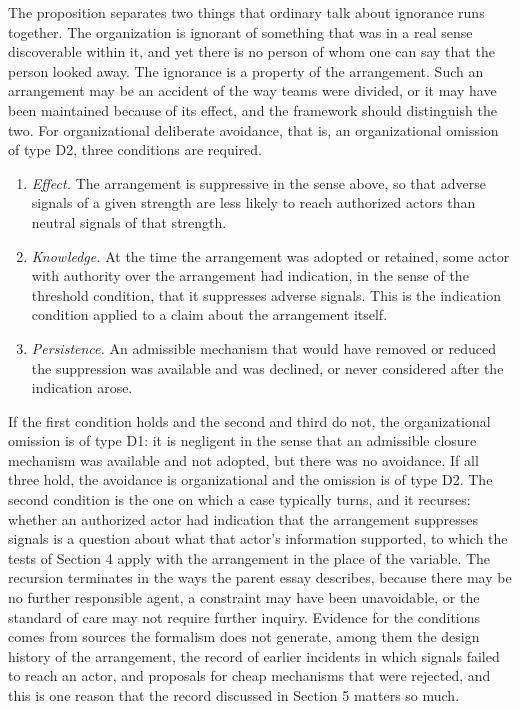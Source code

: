\documentclass[11pt]{article}
\theoremstyle{plain}
\theoremstyle{definition}
\begin{document}
The proposition separates two things that ordinary talk about ignorance runs together. The organization is ignorant of something that was in a real sense discoverable within it, and yet there is no person of whom one can say that the person looked away. The ignorance is a property of the arrangement. Such an arrangement may be an accident of the way teams were divided, or it may have been maintained because of its effect, and the framework should distinguish the two. For organizational deliberate avoidance, that is, an organizational omission of type D2, three conditions are required.

\begin{enumerate}[label=O\arabic*., leftmargin=2.2em, itemsep=0.1em]
\item \emph{Effect.} The arrangement is suppressive in the sense above, so that adverse signals of a given strength are less likely to reach authorized actors than neutral signals of that strength.
\item \emph{Knowledge.} At the time the arrangement was adopted or retained, some actor with authority over the arrangement had indication, in the sense of the threshold condition, that it suppresses adverse signals. This is the indication condition applied to a claim about the arrangement itself.
\item \emph{Persistence.} An admissible mechanism that would have removed or reduced the suppression was available and was declined, or never considered after the indication arose.
\end{enumerate}

If the first condition holds and the second and third do not, the organizational omission is of type D1: it is negligent in the sense that an admissible closure mechanism was available and not adopted, but there was no avoidance. If all three hold, the avoidance is organizational and the omission is of type D2. The second condition is the one on which a case typically turns, and it recurses: whether an authorized actor had indication that the arrangement suppresses signals is a question about what that actor's information supported, to which the tests of Section 4 apply with the arrangement in the place of the variable. The recursion terminates in the ways the parent essay describes, because there may be no further responsible agent, a constraint may have been unavoidable, or the standard of care may not require further inquiry. Evidence for the conditions comes from sources the formalism does not generate, among them the design history of the arrangement, the record of earlier incidents in which signals failed to reach an actor, and proposals for cheap mechanisms that were rejected, and this is one reason that the record discussed in Section 5 matters so much.
\end{document}
